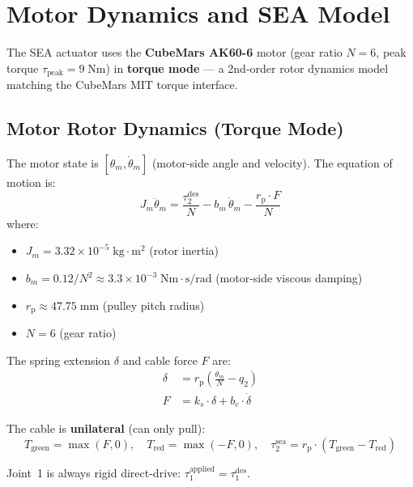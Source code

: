 \documentclass[11pt, a4paper]{article}
\newcommand{\rp}{r_{\mathrm{p}}}
\begin{document}
\section{Motor Dynamics and SEA Model}
\label{sec:motor}

The SEA actuator uses the \textbf{CubeMars AK60-6} motor (gear ratio
$N = 6$, peak torque $\tau_{\text{peak}} = 9\;\text{Nm}$) in \textbf{torque
mode} --- a 2nd-order rotor dynamics model matching the CubeMars MIT
torque interface.

\subsection{Motor Rotor Dynamics (Torque Mode)}

The motor state is $[\theta_m, \dot{\theta}_m]$ (motor-side angle and
velocity).  The equation of motion is:
\begin{equation}
\boxed{
  J_m \ddot{\theta}_m = \frac{\tau_2^{\text{des}}}{N}
  - b_m\,\dot{\theta}_m - \frac{\rp \cdot F}{N}
}
\label{eq:motor_eom}
\end{equation}
where:
\begin{itemize}[nosep]
  \item $J_m = 3.32 \times 10^{-5}\;\text{kg}\cdot\text{m}^2$ (rotor inertia)
  \item $b_m = 0.12/N^2 \approx 3.3 \times 10^{-3}\;\text{Nm}\cdot\text{s/rad}$ (motor-side viscous damping)
  \item $\rp \approx 47.75\;\text{mm}$ (pulley pitch radius)
  \item $N = 6$ (gear ratio)
\end{itemize}

The spring extension $\delta$ and cable force $F$ are:
\begin{align}
  \delta &= \rp \left( \frac{\theta_m}{N} - q_2 \right) \label{eq:spring_ext} \\
  F &= k_s \cdot \delta + b_c \cdot \dot{\delta}  \label{eq:cable_force}
\end{align}

The cable is \textbf{unilateral} (can only pull):
\[
  T_{\text{green}} = \max(F, 0), \quad T_{\text{red}} = \max(-F, 0), \quad
  \tau_2^{\text{sea}} = \rp \cdot (T_{\text{green}} - T_{\text{red}})
\]

Joint~1 is always rigid direct-drive: $\tau_1^{\text{applied}} = \tau_1^{\text{des}}$.
\end{document}
